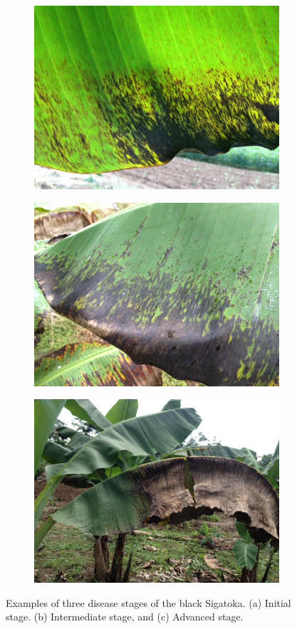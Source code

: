 \documentclass[review]{elsarticle}
\begin{document}
\begin{figure}[h] 
\begin{subfigure}{.3\textwidth}
  \centering
  \includegraphics[width=.8\linewidth]{Roya_a}
  \caption{}
  \label{fig:sfig1}
\end{subfigure}
\begin{subfigure}{.3\textwidth}
  \centering
  \includegraphics[width=.8\linewidth]{Roya_b}
  \caption{}
  \label{fig:sfig2}
\end{subfigure}
\begin{subfigure}{.3\textwidth}
  \centering
  \includegraphics[width=.8\linewidth]{Roya_c}
  \caption{}
  \label{fig:sfig3}
\end{subfigure}
\caption{Examples of three disease stages of the black Sigatoka. (a) Initial stage. (b) Intermediate stage, and (c) Advanced stage.} 
\label{figura1} 
\end{figure}\\
\end{document}
